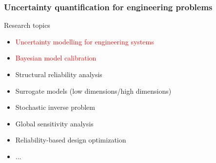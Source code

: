  
\begin{frame}
\frametitle{Uncertainty quantification for engineering problems}
Research topics
\begin{itemize}
    \item \textcolor{red}{Uncertainty modelling for engineering systems}
    \item \textcolor{red}{Bayesian model calibration}
    \item Structural reliability analysis
    \item Surrogate models (low dimensions/high dimensions)
    \item Stochastic inverse problem
    \item Global sensitivity analysis
    \item Reliability-based design optimization
    \item ...
\end{itemize}

\end{frame}




